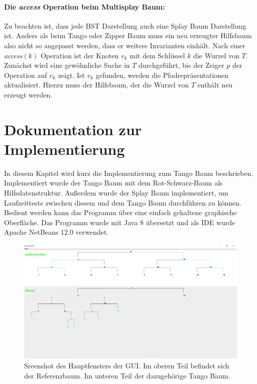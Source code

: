 \documentclass[a4paper,12pt]{article}
\begin{document}
\paragraph{Die \textit{access} Operation beim Multisplay Baum:}
Zu beachten ist, dass jede BST Darstellung auch eine Splay Baum Darstellung ist. Anders als beim Tango oder Zipper Baum muss ein neu erzeugter Hilfsbaum also nicht so angepasst werden, dass er weitere Invarianten einhält.  Nach einer \textit{access}$\left(k\right)$ Operation ist der Knoten $v_k$ mit dem Schlüssel $k$ die Wurzel von $T$. Zunächst wird eine gewöhnliche Suche in $T$ durchgeführt, bis der Zeiger $p$ der Operation auf $v_k$ zeigt. Ist $v_k$ gefunden, werden die Pfadrepräsentationen aktualisiert. Hierzu muss der Hilfsbaum, der die Wurzel von $T$ enthält neu erzeugt werden. \\

\section{Dokumentation zur Implementierung}
In diesem Kapitel wird kurz die Implementierung zum Tango Baum beschrieben. 
Implementiert wurde der Tango Baum mit dem Rot-Schwarz-Baum als Hilfsdatenstruktur. Außerdem wurde der Splay Baum implementiert, um Laufzeittests zwischen diesem und dem Tango Baum durchführen zu können. Bedient werden kann das Programm über eine einfach gehaltene graphische Oberfläche. Das Programm wurde mit Java 8 übersetzt und als IDE wurde Apache NetBeans 12.0 verwendet. 
\begin{figure}[H]
	\centering
	\includegraphics[width= 1\textwidth]{Medien/laufzeittest/MainGUI}
	\caption{Sreenshot des Hauptfensters der GUI. Im oberen Teil befindet sich der Referenzbaum. Im unteren Teil der dazugehörige Tango Baum.}
	\label{fig:TangoBaumGui}
\end{figure}
\end{document}
